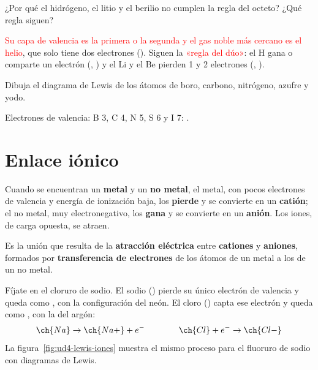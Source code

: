 \begin{exercise}
    ¿Por qué el hidrógeno, el litio y el berilio no cumplen la regla del octeto? ¿Qué regla siguen?
    \begin{solu}
        \textcolor{red}{Su capa de valencia es la primera o la segunda y el gas noble más cercano es el helio}, que solo tiene dos
        electrones (). Siguen la \textcolor{red}{«regla del dúo»}: el H gana o comparte un electrón (, ) y
        el Li y el Be pierden 1 y 2 electrones (, ).
    \end{solu}
\end{exercise}

\begin{exercise}
    Dibuja el diagrama de Lewis de los átomos de boro, carbono, nitrógeno, azufre y yodo.
    \begin{solu}
        Electrones de valencia: B 3, C 4, N 5, S 6 y I 7:
        \textcolor{red}{ \quad {} \quad
         \quad {} \quad
        }.
    \end{solu}
\end{exercise}

\section{Enlace iónico}\label{sec:ud4-ionico}

Cuando se encuentran un \textbf{metal} y un \textbf{no metal}, el metal, con pocos electrones de valencia y energía de ionización
baja, los \textbf{pierde} y se convierte en un \textbf{catión}; el no metal, muy electronegativo, los \textbf{gana} y se convierte
en un \textbf{anión}. Los iones, de carga opuesta, se atraen.

\begin{definition}
    Es la unión que resulta de la \textbf{atracción eléctrica} entre \textbf{cationes} y \textbf{aniones}, formados por
    \textbf{transferencia de electrones} de los átomos de un metal a los de un no metal.
\end{definition}

Fíjate en el cloruro de sodio. El sodio () pierde su único electrón de valencia y queda como
, con la configuración del neón. El cloro () capta ese electrón y queda como ,
con la del argón:
\[ \ch{Na} \rightarrow \ch{Na+} + e^- \qquad\qquad \ch{Cl} + e^- \rightarrow \ch{Cl-} \]
La figura~\ref{fig:ud4-lewis-iones} muestra el mismo proceso para el fluoruro de sodio con diagramas de Lewis.


